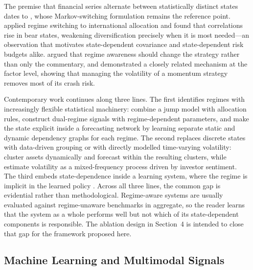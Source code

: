 \documentclass{singlecol-new}
\theoremstyle{TH}{
\newtheorem{lemma}{Lemma}
\newtheorem{theorem}[lemma]{Theorem}
\newtheorem{corrolary}[lemma]{Corrolary}
\newtheorem{conjecture}[lemma]{Conjecture}
\newtheorem{proposition}[lemma]{Proposition}
\newtheorem{claim}[lemma]{Claim}
\newtheorem{stheorem}[lemma]{Wrong Theorem}
\newtheorem{algorithm}{Algorithm}
}
\theoremstyle{THrm}{
\newtheorem{definition}{Definition}[section]
\newtheorem{question}{Question}[section]
\newtheorem{remark}{Remark}
\newtheorem{scheme}{Scheme}
}
\theoremstyle{THhit}{
\newtheorem{case}{Case}[section]
}
\begin{document}
The premise that financial series alternate between statistically distinct states dates
to \citet{hamilton89}, whose Markov-switching formulation remains the reference point.
\citet{angbekaert02} applied regime switching to international allocation and found that
correlations rise in bear states, weakening diversification precisely when it is most
needed---an observation that motivates state-dependent covariance and state-dependent
risk budgets alike. \citet{kritzman12} argued that regime awareness should change the
strategy rather than only the commentary, and \citet{barroso15} demonstrated a
closely related mechanism at the factor level, showing that managing the volatility of
a momentum strategy removes most of its crash risk.

Contemporary work continues along three lines. The first identifies regimes with
increasingly flexible statistical machinery: \citet{li25} combine a jump model with
allocation rules, \citet{luo26} construct dual-regime signals with regime-dependent
parameters, and \citet{bukhari26} make the state explicit inside a forecasting network by
learning separate static and dynamic dependency graphs for each regime. The second
replaces discrete states with data-driven grouping or with directly modelled
time-varying volatility: \citet{kehinde26} cluster assets dynamically and forecast within
the resulting clusters, while \citet{naidoo25} estimate volatility as a mixed-frequency
process driven by investor sentiment. The third embeds state-dependence inside a
learning system, where the regime is implicit in the learned policy \citep{jiang25}.
Across all three lines, the common gap is evidential rather than methodological. Regime-aware systems are usually
evaluated against regime-unaware benchmarks in aggregate, so the reader learns that the
system as a whole performs well but not which of its state-dependent components is
responsible. The ablation design in Section~4 is intended to close that gap for the
framework proposed here.

\subsection{Machine Learning and Multimodal Signals}
\end{document}

